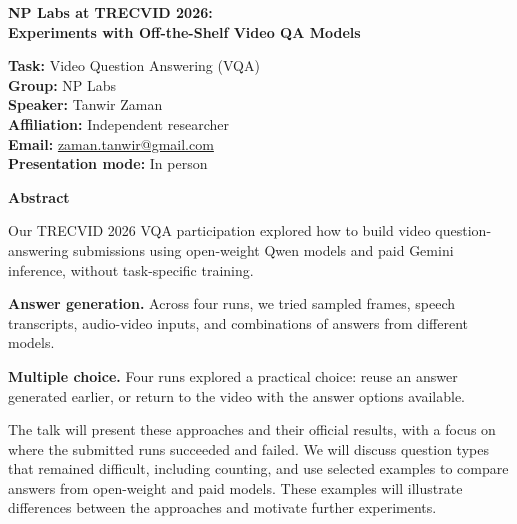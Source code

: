 \documentclass[11pt,letterpaper]{article}
\begin{document}
{\large\bfseries NP Labs at TRECVID 2026:\\Experiments with Off-the-Shelf Video QA Models\par}
\vspace{8pt}
\textbf{Task:} Video Question Answering (VQA)\\
\textbf{Group:} NP Labs\\
\textbf{Speaker:} Tanwir Zaman\\
\textbf{Affiliation:} Independent researcher\\
\textbf{Email:} \href{mailto:zaman.tanwir@gmail.com}{zaman.tanwir@gmail.com}\\
\textbf{Presentation mode:} In person
\vspace{8pt}

\textbf{Abstract}
\raggedright

Our TRECVID 2026 VQA participation explored how to build video question-answering submissions using open-weight Qwen models and paid Gemini inference, without task-specific training.

\textbf{Answer generation.} Across four runs, we tried sampled frames, speech transcripts, audio-video inputs, and combinations of answers from different models.

\textbf{Multiple choice.} Four runs explored a practical choice: reuse an answer generated earlier, or return to the video with the answer options available.

The talk will present these approaches and their official results, with a focus on where the submitted runs succeeded and failed. We will discuss question types that remained difficult, including counting, and use selected examples to compare answers from open-weight and paid models. These examples will illustrate differences between the approaches and motivate further experiments.
\end{document}
